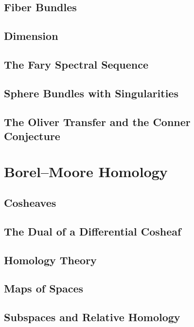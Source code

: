 \documentclass[11pt, a4paper]{article}
\begin{document}
\subsection{Fiber Bundles}

\subsection{Dimension}

\subsection{The Fary Spectral Sequence}

\subsection{Sphere Bundles with Singularities}

\subsection{The Oliver Transfer and the Conner Conjecture}

\section{Borel--Moore Homology}

\subsection{Cosheaves}

\subsection{The Dual of a Differential Cosheaf}

\subsection{Homology Theory}

\subsection{Maps of Spaces}

\subsection{Subspaces and Relative Homology}
\end{document}
